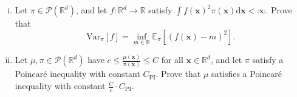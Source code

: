 \begin{enumerate}[(i)]
    \item Let $\pi \in \mathcal{P}(\mathbb{R}^d)$, and let $f : \mathbb{R}^d \to \mathbb{R}$ satisfy $\int f(\mathbf{x})^2 \pi(\mathbf{x}) \mathrm{d}\mathbf{x} < \infty$. Prove that
    \[
        \mathrm{Var}_\pi[f] = \inf_{m \in \mathbb{R}} \mathbb{E}_\pi\left[(f(\mathbf{x}) - m)^2\right].
    \]

    \item Let $\mu, \pi \in \mathcal{P}(\mathbb{R}^d)$ have $c \leq \frac{\mu(\mathbf{x})}{\pi(\mathbf{x})} \leq C$ for all $\mathbf{x} \in \mathbb{R}^d$, and let $\pi$ satisfy a Poincar\'e inequality with constant $C_{\mathrm{PI}}$. Prove that $\mu$ satisfies a Poincar\'e inequality with constant $\frac{C}{c} \cdot C_{\mathrm{PI}}$.
\end{enumerate}
